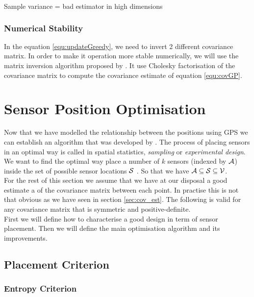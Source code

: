 \documentclass[12pt,twoside]{report}
\begin{document}
Sample variance = bad estimator in high dimensions



\subsubsection{Numerical Stability}

In the equation \ref{equ:updateGreedy}, we need to invert 2 different covariance matrix. In order to make it operation more stable numerically, we will use the matrix inversion algorithm proposed by \cite[p.~19]{rasmussen_gaussian_2006}. It use Cholesky factorisation of the covariance matrix to compute the covariance estimate of equation \ref{equ:covGP}. 



\section{Sensor Position Optimisation}

Now that we have modelled the relationship between the positions using GPS we can establish an algorithm that was developed by \citet{krause_near-optimal_2008}. The process of placing sensors in an optimal way is called in spatial statistics, \textit{sampling} or \textit{experimental design}. We want to find the optimal way place a number of $k$ sensors (indexed by $\A$) inside the set of possible sensor locations $\S$ . So that we have $\A \subseteq \S \subseteq \V$. \\


For the rest of this section we assume that we have at our disposal a good estimate a of the covariance matrix between each point. In practise this is not that obvious as we have seen in section \ref{sec:cov_est}. The following is valid for any covariance matrix that is symmetric and positive-definite. \\ 

First we will define how to characterise a good design in term of sensor placement. Then we will define the main optimisation algorithm and its improvements. \\ 

\subsection{Placement Criterion}

\subsubsection{Entropy Criterion}
\end{document}
